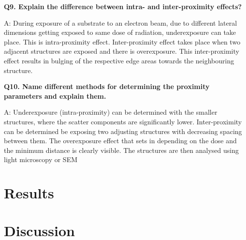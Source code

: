 \documentclass[12pt]{article}
\begin{document}
\textbf{Q9. Explain the difference between intra- and inter-proximity effects?}

A: During exposure of a substrate to an electron beam, due to different lateral dimensions getting
exposed to same dose of radiation, underexposure can take place. This is intra-proximity effect.
Inter-proximity effect takes place when two adjacent structures are exposed and there is
overexposure. This inter-proximity effect results in bulging of the respective edge areas
towards the neighbouring structure.

\textbf{Q10. Name different methods for determining the proximity parameters and explain them.}

A: Underexposure (intra-proximity) can be determined with the smaller structures, where the
scatter components are significantly lower.
Inter-proximity can be determined be exposing two adjusting structures with decreasing
spacing between them. The overexposure effect that sets in depending on the dose and the
minimum distance is clearly visible.
The structures are then analysed using light microscopy or SEM

\section{Results}

\section{Discussion}

\printbibliography
\end{document}
